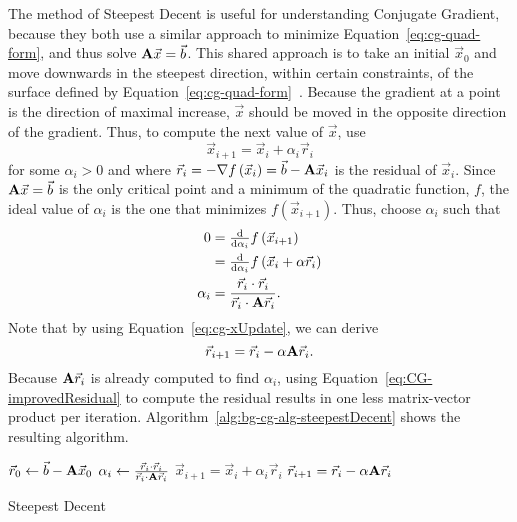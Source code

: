 The method of Steepest Decent is useful for understanding Conjugate Gradient, because they both use a similar approach to minimize Equation~\ref{eq:cg-quad-form}, and thus solve \(\mathbf{A}\vec{x}=\vec{b}\).
This shared approach is to take an initial \(\vec{x}_0\) and move downwards in the steepest direction, within certain constraints, of the surface defined by Equation~\ref{eq:cg-quad-form}~\cite{Nearing:2010:toolsForPhysics}.
Because the gradient at a point is the direction of maximal increase, \(\vec{x}\) should be moved in the opposite direction of the gradient.
Thus, to compute the next value of \(\vec{x}\), use
\begin{equation}
\label{eq:cg-xUpdate}
	\vec{x}_{i+1} = \vec{x}_i + \alpha_i \vec{r}_i
\end{equation}
for some \(\alpha_i > 0\) and where \(\vec{r}_i = -\nabla f\left(\vec{x}_i\right) = \vec{b} - \mathbf{A}\vec{x}_i\) is the residual of \(\vec{x}_i\).
Since \(\mathbf{A}\vec{x} = \vec{b}\) is the only critical point and a minimum of the quadratic function, \(f\), the ideal value of \(\alpha_i\) is the one that minimizes \(f\left(\vec{x}_{i+1}\right)\).
Thus, choose \(\alpha_i\) such that
\begin{align*}
	0
	&= \tfrac{\mathrm{d}}{\mathrm{d} \alpha_i} f\left(\vec{x}_{i+1}\right) \\
	&= \tfrac{\mathrm{d}}{\mathrm{d} \alpha_i} f\left(\vec{x}_i + \alpha \vec{r}_i\right) \\
%
	\alpha_i
	&= \frac{\vec{r}_i\cdot \vec{r}_i}{\vec{r}_i\cdot\mat{A}\vec{r}_i}.
\end{align*}
Note that by using Equation~\ref{eq:cg-xUpdate}, we can derive
\begin{equation}
\label{eq:CG-improvedResidual}
	\vec{r}_{i+1} = \vec{r}_i - \alpha\mathbf{A}\vec{r}_i.
\end{equation}
Because \(\mathbf{A}\vec{r}_i\) is already computed to find \(\alpha_i\), using Equation~\ref{eq:CG-improvedResidual} to compute the residual results in one less matrix-vector product per iteration.
Algorithm~\ref{alg:bg-cg-alg-steepestDecent} shows the resulting algorithm.
\begin{algorithm}[tb]
	\begin{algorithmic}
		\STATE \(\vec{r}_0 \gets \vec{b} - \mathbf{A}\vec{x}_0\)
			\STATE \(\alpha_i \gets \frac{\vec{r}_i\cdot \vec{r}_i}{\vec{r}_i\cdot\mathbf{A}\vec{r}_i}\)
			\STATE \(\vec{x}_{i+1} = \vec{x}_i + \alpha_i\vec{r}_i\)
			\STATE \(\vec{r}_{i+1} = \vec{r}_i - \alpha\mathbf{A}\vec{r}_i\)
		\ENDFOR
	\end{algorithmic}
	
	\caption{Steepest Decent~\cite{Shewchuk:1994:IntroToCG}}
	\label{alg:bg-cg-alg-steepestDecent}
\end{algorithm}


